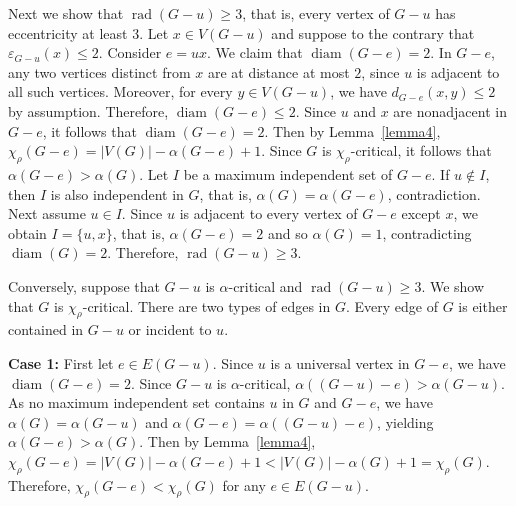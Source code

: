 \documentclass[12pt]{article}
\newcommand{\ie}{that is}
\begin{document}
Next we show that $\operatorname{rad}(G-u) \geq 3$, \ie, every vertex of $G-u$ has eccentricity at least $3$. Let $x \in V(G-u)$ and suppose to the contrary that $\varepsilon_{G-u}(x)\le 2$. Consider $e=ux$. We claim that $\operatorname{diam}(G-e)=2$.
In $G-e$, any two vertices distinct from $x$ are at distance at most $2$, since $u$ is adjacent to all such vertices. Moreover, for every $y \in V(G-u)$, we have $d_{G-e}(x,y) \le 2$ by assumption. Therefore, $\operatorname{diam}(G-e) \le 2$. Since $u$ and $x$ are nonadjacent in $G-e$, it follows that $\operatorname{diam}(G-e)=2$.
Then by Lemma~\ref{lemma4},
$\chi_\rho(G-e)=|V(G)|-\alpha(G-e)+1.$
Since $G$ is $\chi_\rho$-critical, it follows that $\alpha(G-e)>\alpha(G)$.
Let $I$ be a maximum independent set of $G-e$. If $u \notin I$, then $I$ is also independent in $G$, \ie, $\alpha(G)=\alpha(G-e)$, contradiction. Next assume $u \in I$. Since $u$ is adjacent to every vertex of $G-e$ except $x$, we obtain $I=\{u,x\}$, \ie, $\alpha(G-e)=2$ and so $\alpha(G)=1$, contradicting $\operatorname{diam}(G)=2$.
Therefore, $\operatorname{rad}(G-u) \geq 3$.

Conversely, suppose that $G-u$ is $\alpha$-critical and $\operatorname{rad}(G-u) \geq 3$. We show that $G$ is $\chi_\rho$-critical. There are two types of edges in $G$. Every edge of $G$ is either contained in $G-u$ or incident to $u$. 

\textbf{Case 1:} First let $e \in E(G-u)$. Since $u$ is a universal vertex in $G-e$, we have $\operatorname{diam}(G-e)=2$. Since $G-u$ is $\alpha$-critical,
$\alpha((G-u)-e)>\alpha(G-u).$
As no maximum independent set contains $u$ in $G$ and $G-e$, we have $\alpha(G)=\alpha(G-u)$ and $\alpha(G-e)=\alpha((G-u)-e)$, yielding
$\alpha(G-e)>\alpha(G).$ Then
by Lemma~\ref{lemma4},
$\chi_\rho(G-e)=|V(G)|-\alpha(G-e)+1<|V(G)|-\alpha(G)+1=\chi_\rho(G).$ Therefore, $\chi_\rho(G-e)<\chi_\rho(G)$ for any $e \in E(G-u)$. 
\end{document}
